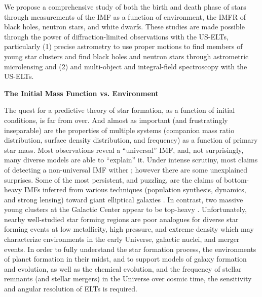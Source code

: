 \documentclass[11pt]{article}
\begin{document}
We propose a comprehensive study of both the birth and death
phase of stars through measurements of the IMF as a function of
environment, the IMFR of black holes, neutron stars, and white
dwarfs. These studies are made possible through the power of
diffraction-limited observations with the US-ELTs, particularly 
(1) precise astrometry to use proper motions
to find members of young star clusters and find black holes and
neutron stars through astrometric microlensing and (2) and multi-object
and integral-field spectroscopy with the US-ELTs.

{\bf \large The Initial Mass Function vs. Environment}

The quest for a predictive theory of star formation, as a function of initial conditions, is far from over.  And almost as important (and frustratingly inseparable) are the properties of multiple systems (companion mass ratio distribution, surface density distribution, and frequency) as a function of primary star mass. 
Most observations reveal a “universal” IMF, and, not surprisingly, many diverse models are able to “explain” it. 
Under intense scrutiny, most claims of detecting a non-universal IMF wither \citep[c.f.][]{Bastian:2010,Luhman:2018}; however there are some unexplained surprises.  
Some of the most persistent, and puzzling, are the claims of bottom-heavy IMFs inferred from various techniques (population synthesis, dynamics, and strong lensing) toward giant elliptical galaxies \citep[e.g.][]{vanDokkum:2010}.  In contrast, two massive young clusters at the Galactic Center appear to be top-heavy \citep{Lu:2013,Hosek:2018b}.
Unfortunately, nearby well-studied star forming regions are poor analogues for diverse star forming events at low metallicity, high pressure, and extreme density which may characterize environments in the early Universe, galactic nuclei, and merger events. 
In order to fully understand the star formation process, the environments of planet formation in their midst, and to support models of galaxy formation and evolution, as well as the chemical evolution, and the frequency of stellar remnants (and stellar mergers) in the Universe over cosmic time, the sensitivity and angular resolution of ELTs is required.
 
\end{document}
